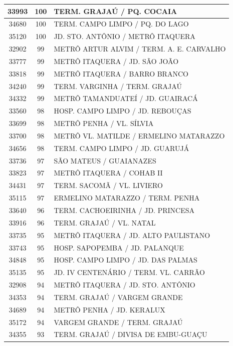 \documentclass[
	12pt,				%
	oneside,			%
	a4paper,			%
	english,			%
	brazil				%
	]{abntex2ppgsi}
\begin{document}
{{{\begin{apendicesenv}
\begin{longtable}{c|c|p{7cm}}
 \hline 
33993 &	100 &	TERM. GRAJAÚ / PQ. COCAIA \\ 
 \hline 
34680 &	100 &	TERM. CAMPO LIMPO / PQ. DO LAGO \\ 
 \hline 
35120 &	100 &	JD. STO. ANTÔNIO / METRÔ ITAQUERA \\ 
 \hline 
32902 &	99 &	METRÔ ARTUR ALVIM / TERM. A. E. CARVALHO \\ 
 \hline 
33777 &	99 &	METRÔ ITAQUERA / JD. SÃO JOÃO \\ 
 \hline 
33818 &	99 &	METRÔ ITAQUERA / BARRO BRANCO \\ 
 \hline 
34240 &	99 &	TERM. VARGINHA / TERM. GRAJAÚ \\ 
 \hline 
34332 &	99 &	METRÔ TAMANDUATEÍ / JD. GUAIRACÁ \\ 
 \hline 
33560 &	98 &	HOSP. CAMPO LIMPO / JD. REBOUÇAS \\ 
 \hline 
33699 &	98 &	METRÔ PENHA / VL. SÍLVIA \\ 
 \hline 
33700 &	98 &	METRÔ VL. MATILDE / ERMELINO MATARAZZO \\ 
 \hline 
34656 &	98 &	TERM. CAMPO LIMPO / JD. GUARUJÁ \\ 
 \hline 
33736 &	97 &	SÃO MATEUS / GUAIANAZES \\ 
 \hline 
33823 &	97 &	METRÔ ITAQUERA / COHAB II \\ 
 \hline 
34431 &	97 &	TERM. SACOMÃ / VL. LIVIERO \\ 
 \hline 
35115 &	97 &	ERMELINO MATARAZZO / TERM. PENHA \\ 
 \hline 
33640 &	96 &	TERM. CACHOEIRINHA / JD. PRINCESA \\ 
 \hline 
33916 &	96 &	TERM. GRAJAÚ / VL. NATAL \\ 
 \hline 
33735 &	95 &	METRÔ ITAQUERA / JD. ALTO PAULISTANO \\ 
 \hline 
33743 &	95 &	HOSP. SAPOPEMBA / JD. PALANQUE \\ 
 \hline 
34848 &	95 &	HOSP. CAMPO LIMPO / JD. DAS PALMAS \\ 
 \hline 
35135 &	95 &	JD. IV CENTENÁRIO / TERM. VL. CARRÃO \\ 
 \hline 
32908 &	94 &	METRÔ ITAQUERA / JD. STO. ANTÔNIO \\ 
 \hline 
34353 &	94 &	TERM. GRAJAÚ / VARGEM GRANDE \\ 
 \hline 
34689 &	94 &	METRÔ PENHA / JD. KERALUX \\ 
 \hline 
35172 &	94 &	VARGEM GRANDE / TERM. GRAJAÚ \\ 
 \hline 
34355 &	93 &	TERM. GRAJAÚ / DIVISA DE EMBU-GUAÇU \\ 

\end{longtable}
\end{apendicesenv}}}}
\end{document}
